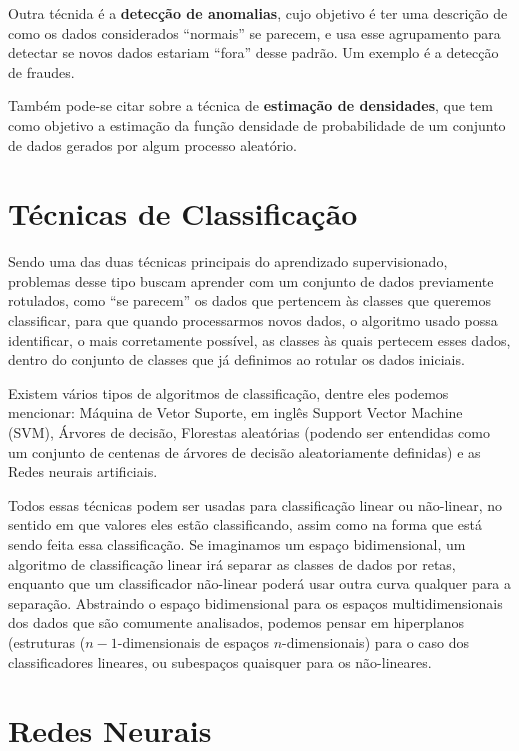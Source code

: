 \documentclass[12pt,brazil]{article}
\begin{document}
Outra técnida é a \textbf{detecção de anomalias}, cujo objetivo é ter uma descrição de como os dados considerados ``normais'' se parecem, e usa esse agrupamento para detectar se novos dados estariam ``fora'' desse padrão. Um exemplo é a detecção de fraudes.

Também pode-se citar sobre a técnica de \textbf{estimação de densidades}, que tem como objetivo a estimação da função densidade de probabilidade de um conjunto de dados gerados por algum processo aleatório.

\section{Técnicas de Classificação}

Sendo uma das duas técnicas principais do aprendizado supervisionado, problemas desse tipo buscam aprender com um conjunto de dados previamente rotulados, como ``se parecem'' os dados que pertencem às classes que queremos classificar, para que quando processarmos novos dados, o algoritmo usado possa identificar, o mais corretamente possível, as classes às quais pertecem esses dados, dentro do conjunto de classes que já definimos ao rotular os dados iniciais.

Existem vários tipos de algoritmos de classificação, dentre eles podemos mencionar: Máquina de Vetor Suporte, em inglês Support Vector Machine (SVM), Árvores de decisão, Florestas aleatórias (podendo ser entendidas como um conjunto de centenas de árvores de decisão aleatoriamente definidas) e as Redes neurais artificiais.

Todos essas técnicas podem ser usadas para classificação linear ou não-linear, no sentido em que valores eles estão classificando, assim como na forma que está sendo feita essa classificação. Se imaginamos um espaço bidimensional, um algoritmo de classificação linear irá separar as classes de dados por retas, enquanto que um classificador não-linear poderá usar outra curva qualquer para a separação. Abstraindo o espaço bidimensional para os espaços multidimensionais dos dados que são comumente analisados, podemos pensar em hiperplanos (estruturas ($n{-}1$-dimensionais de espaços $n$-dimensionais) para o caso dos classificadores lineares, ou subespaços quaisquer para os não-lineares.

\section{Redes Neurais}
\end{document}
